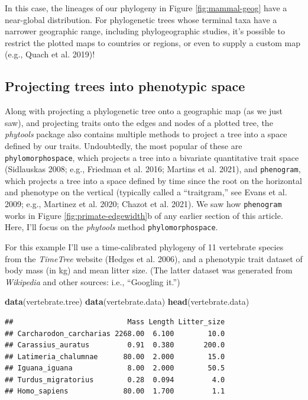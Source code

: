 \documentclass[fleqn,10pt,lineno]{wlpeerj} %
\newenvironment{Shaded}{\begin{snugshade}}{\end{snugshade}}
\newcommand{\FunctionTok}[1]{\textcolor[rgb]{0.13,0.29,0.53}{\textbf{#1}}}
\newcommand{\NormalTok}[1]{#1}
\begin{document}
In this case, the lineages of our phylogeny in Figure \ref{fig:mammal-geog} have a near-global distribution. For phylogenetic trees whose terminal taxa have a narrower geographic range, including phylogeographic studies, it's possible to restrict the plotted maps to countries or regions, or even to supply a custom map (e.g., Quach et al. 2019)!

\hypertarget{projecting-trees-into-phenotypic-space}{%
\subsection{Projecting trees into phenotypic space}\label{projecting-trees-into-phenotypic-space}}

Along with projecting a phylogenetic tree onto a geographic map (as we just saw), and projecting traits onto the edges and nodes of a plotted tree, the \emph{phytools} package also contains multiple methods to project a tree into a space defined by our traits. Undoubtedly, the most popular of these are \texttt{phylomorphospace}, which projects a tree into a bivariate quantitative trait space (Sidlauskas 2008; e.g., Friedman et al. 2016; Martins et al. 2021), and \texttt{phenogram}, which projects a tree into a space defined by time since the root on the horizontal and phenotype on the vertical (typically called a ``traitgram,'' see Evans et al. 2009; e.g., Martinez et al. 2020; Chazot et al. 2021). We saw how \texttt{phenogram} works in Figure \ref{fig:primate-edgewidth}b of any earlier section of this article. Here, I'll focus on the \emph{phytools} method \texttt{phylomorphospace}.

For this example I'll use a time-calibrated phylogeny of 11 vertebrate species from the \emph{TimeTree} website (Hedges et al. 2006), and a phenotypic trait dataset of body mass (in kg) and mean litter size. (The latter dataset was generated from \emph{Wikipedia} and other sources: i.e., ``Googling it.'')

\begin{Shaded}
\begin{Highlighting}[]
\FunctionTok{data}\NormalTok{(vertebrate.tree)}
\FunctionTok{data}\NormalTok{(vertebrate.data)}
\FunctionTok{head}\NormalTok{(vertebrate.data)}
\end{Highlighting}
\end{Shaded}

\begin{verbatim}
##                           Mass Length Litter_size
## Carcharodon_carcharias 2268.00  6.100        10.0
## Carassius_auratus         0.91  0.380       200.0
## Latimeria_chalumnae      80.00  2.000        15.0
## Iguana_iguana             8.00  2.000        50.5
## Turdus_migratorius        0.28  0.094         4.0
## Homo_sapiens             80.00  1.700         1.1
\end{verbatim}
\end{document}
